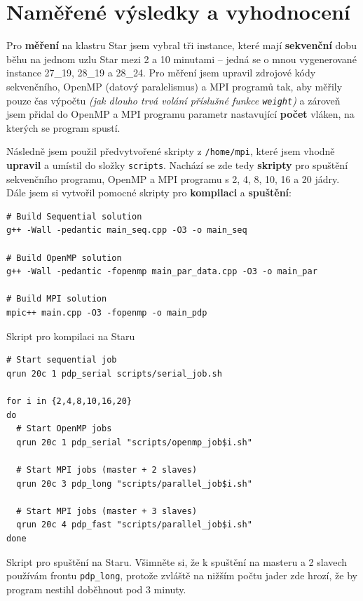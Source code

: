 \label{4_measure}

\section{Naměřené výsledky a vyhodnocení}

Pro \textbf{měření} na klastru Star jsem vybral tři instance, které mají \textbf{sekvenční} dobu běhu na jednom uzlu Star mezi 2 a 10 minutami -- jedná se o mnou vygenerované instance 27\_19, 28\_19 a 28\_24. Pro měření jsem upravil zdrojové kódy sekvenčního, OpenMP (datový paralelismus) a MPI programů tak, aby měřily pouze čas výpočtu \textit{(jak dlouho trvá volání příslušné funkce \texttt{weight})} a zároveň jsem přidal do OpenMP a MPI programu parametr nastavující \textbf{počet} vláken, na kterých se program spustí.

Následně jsem použil předvytvořené skripty z \texttt{/home/mpi}, které jsem vhodně \textbf{upravil} a umístil do složky \texttt{scripts}. Nachází se zde tedy \textbf{skripty} pro spuštění sekvenčního programu, OpenMP a MPI programu s 2, 4, 8, 10, 16 a 20 jádry. Dále jsem si vytvořil pomocné skripty pro \textbf{kompilaci} a \textbf{spuštění}:

\begin{listing}[H]
    \begin{verbatim}
# Build Sequential solution
g++ -Wall -pedantic main_seq.cpp -O3 -o main_seq

# Build OpenMP solution
g++ -Wall -pedantic -fopenmp main_par_data.cpp -O3 -o main_par

# Build MPI solution
mpic++ main.cpp -O3 -fopenmp -o main_pdp
    \end{verbatim}
    \caption{Skript pro kompilaci na Staru}
\end{listing}

\begin{listing}[H]
    \begin{verbatim}
# Start sequential job
qrun 20c 1 pdp_serial scripts/serial_job.sh

for i in {2,4,8,10,16,20}
do
  # Start OpenMP jobs
  qrun 20c 1 pdp_serial "scripts/openmp_job$i.sh"

  # Start MPI jobs (master + 2 slaves)
  qrun 20c 3 pdp_long "scripts/parallel_job$i.sh"

  # Start MPI jobs (master + 3 slaves)
  qrun 20c 4 pdp_fast "scripts/parallel_job$i.sh"
done
    \end{verbatim}
    \caption{Skript pro spuštění na Staru. Všimněte si, že k spuštění na masteru a 2 slavech používám frontu \texttt{pdp_long}, protože zvláště na nižším počtu jader zde hrozí, že by program nestihl doběhnout pod 3 minuty.}
\end{listing}

